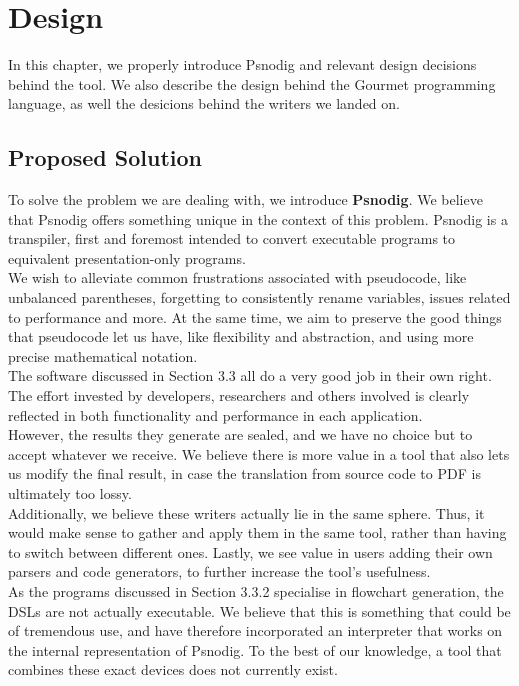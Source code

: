 \chapter{Design}

In this chapter, we properly introduce Psnodig and relevant design decisions behind the tool. We also describe the design behind the Gourmet programming language, as well the desicions behind the writers we landed on.

\section{Proposed Solution}

To solve the problem we are dealing with, we introduce \textbf{Psnodig}. We believe that Psnodig offers something unique in the context of this problem. Psnodig is a transpiler, first and foremost intended to convert executable programs to equivalent presentation-only programs. \\

We wish to alleviate common frustrations associated with pseudocode, like unbalanced parentheses, forgetting to consistently rename variables, issues related to performance and more. At the same time, we aim to preserve the good things that pseudocode let us have, like flexibility and abstraction, and using more precise mathematical notation. \\

The software discussed in Section 3.3 all do a very good job in their own right. The effort invested by developers, researchers and others involved is clearly reflected in both functionality and performance in each application. \\

However, the results they generate are sealed, and we have no choice but to accept whatever we receive. We believe there is more value in a tool that also lets us modify the final result, in case the translation from source code to PDF is ultimately too lossy. \\

Additionally, we believe these writers actually lie in the same sphere. Thus, it would make sense to gather and apply them in the same tool, rather than having to switch between different ones. Lastly, we see value in users adding their own parsers and code generators, to further increase the tool's usefulness. \\

As the programs discussed in Section 3.3.2 specialise in flowchart generation, the DSLs are not actually executable. We believe that this is something that could be of tremendous use, and have therefore incorporated an interpreter that works on the internal representation of Psnodig. To the best of our knowledge, a tool that combines these exact devices does not currently exist.

